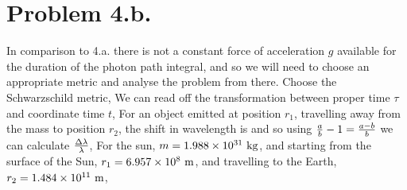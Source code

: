 \documentclass{article}
\begin{document}
\section*{Problem 4.b.}
In comparison to 4.a. there is not a constant force of acceleration $g$ available for the duration of the photon path integral, and so we will need to choose an appropriate metric and analyse the problem from there. Choose the Schwarzschild metric,
We can read off the transformation between proper time $\tau$ and coordinate time $t$,
For an object emitted at position $r_1$, travelling away from the mass to position $r_2$, the shift in wavelength is
and so using $\frac{a}{b}-1=\frac{a-b}{b}$ we can calculate $\frac{\Delta \lambda}{\lambda}$,
For the sun, $m=1.988\times 10^{31}\textrm{ kg}$, and starting from the surface of the Sun, $r_1=6.957\times 10^{8}\textrm{ m}$, and travelling to the Earth, $r_2=1.484\times 10^{11}\textrm{ m}$,
\end{document}
